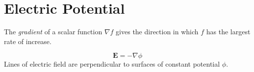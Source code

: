\section{Electric Potential}
The \textit{gradient} of a scalar function $\nabla f$ gives the direction in which $f$ has the largest
rate of increase.

\begin{equation*}
    \mathbf{E} = - \nabla \phi
\end{equation*}
Lines of electric field are perpendicular to surfaces of constant potential $\phi$.